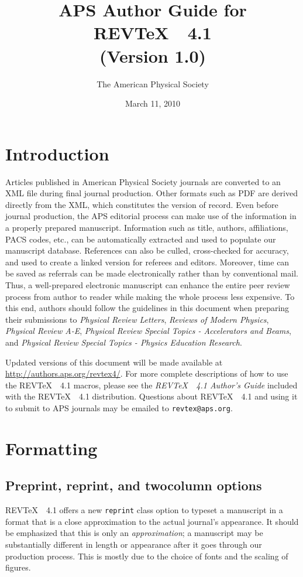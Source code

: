 \documentclass[twocolumn,secnumarabic,amssymb, nobibnotes, aps, prd]{revtex4-1}
\newcommand{\revtex}{REV\TeX\ }
\newcommand{\classoption}[1]{\texttt{#1}}
\begin{document}
\title{APS Author Guide for \revtex~4.1\\(Version 1.0)}%

\author{The American Physical Society}%
\date{March 11, 2010}%
\maketitle
\tableofcontents

\section{Introduction}
Articles published in American Physical Society journals are converted to 
an XML file during final journal production. Other formats such
as PDF are derived directly from the XML, which constitutes the version of record. 
Even before journal production, the APS editorial process can make use
of the information in a properly prepared manuscript. Information such
as title, authors, affiliations, PACS codes, etc., can be automatically
extracted and used to populate our manuscript database. References can
also be culled, cross-checked for accuracy, and used to create a
linked version for referees and editors. Moreover, time can be saved
as referrals can be made electronically rather than by conventional
mail. Thus, a well-prepared electronic manuscript can enhance the
entire peer review process from author to reader while making the
whole process less expensive. To this end, authors should follow the
guidelines in this document when preparing their submissions to \textit{Physical Review Letters},
 \textit{Reviews of Modern Physics},  \textit{Physical Review A-E},  \textit{Physical Review Special Topics - Accelerators and Beams}, and  \textit{Physical Review Special Topics - Physics Education Research}.
 
Updated versions of this document will be made available at  \url{http://authors.aps.org/revtex4/}. For more complete
descriptions of how to use the \revtex\ 4.1 macros, please see the
\textit{\revtex~4.1 Author's Guide} included with the \revtex~4.1
distribution. Questions about \revtex\ 4.1 and using it to submit to APS journals may be
emailed to \texttt{revtex@aps.org}.

\section{Formatting}
\subsection{Preprint, reprint, and twocolumn options}
\revtex~4.1 offers a new \classoption{reprint} class option to typeset a manuscript
in a format that is a close approximation to the actual journal's appearance. It should
be emphasized that this is only an \textit{approximation}; a manuscript may be substantially different
in length or appearance after it goes through our production process. This is mostly due to the choice
of fonts and the scaling of figures.
\end{document}
